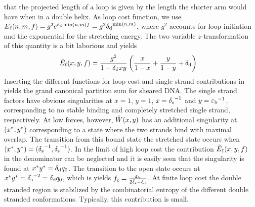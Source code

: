 that the projected length of a loop is given by the length the shorter arm would have when in a double
helix. As loop cost function, we use  ${E_{\ell}}(n,m,f)=g^{2}e^{{\ell_{\rm d}}\min(n,m)f}=g^{2}{\delta_{\rm d}}^{\min(n,m)}$, where $g^{2}$ accounts for loop initiation and the exponential for the stretching energy. 
The two variable $z$-transformation of this quantity is a bit laborious and yields
\begin{equation}
{\hat{E}_{\ell}}(x,y,f)=\frac{g^2}{1-{\delta_{\rm d}} xy}\left(\frac{x}{1-x}+\frac{y}{1-y}+{\delta_{\rm d}}\right)
\end{equation}
Inserting the different functions for loop cost and single strand contributions in 
yields the grand canonical partition sum for sheared DNA. The single strand factors have obvious
singularities at $x=1$, $y=1$, $x={\delta_{\rm s}}^{-1}$ and $y={\varepsilon_{\rm b}}^{-1}$, corresponding to no stable binding 
 and completely stretched single strand, respectively. At low forces, however, $\hat{W}(x,y)$ has
an additional singularity at $({x^*}, {y^*})$ corresponding to a state where the two strands bind with maximal 
overlap. The transition from this bound state the stretched state occurs when $({x^*},{y^*}) = ({\delta_{\rm s}}^{-1}, {\delta_{\rm s}}^{-1})$.
In the limit of high loop cost the contribution ${\hat{E}_{\ell}}(x,y,f)$ in the denominator can be neglected and 
it is easily seen that the singularity is found at ${x^*}{y^*}={\delta_{\rm d}} q_0$. The transition to the open state
occurs at ${x^*}{y^*}={\delta_{\rm s}}^{-2}={\delta_{\rm d}} q_0$, which is yields ${f_c}=\frac{{\varepsilon_{\rm b}}}{2{\bar{\ell}_{\rm s}}-{\ell_{\rm d}}}$. At finite loop
cost the double stranded region is stabilized by the combinatorial entropy of the different double stranded
conformations. Typically, this contribution is small.


